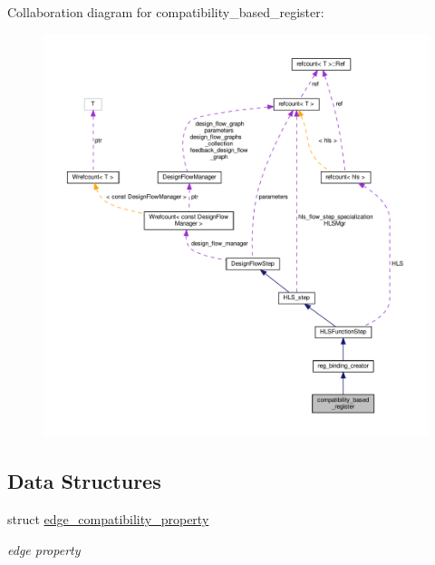 Collaboration diagram for compatibility\+\_\+based\+\_\+register\+:
\nopagebreak
\begin{figure}[H]
\begin{center}
\leavevmode
\includegraphics[width=350pt]{d5/d54/classcompatibility__based__register__coll__graph}
\end{center}
\end{figure}
\subsection*{Data Structures}
\begin{DoxyCompactItemize}
\item 
struct \hyperlink{structcompatibility__based__register_1_1edge__compatibility__property}{edge\+\_\+compatibility\+\_\+property}
\begin{DoxyCompactList}\small\item\em edge property \end{DoxyCompactList}\end{DoxyCompactItemize}
